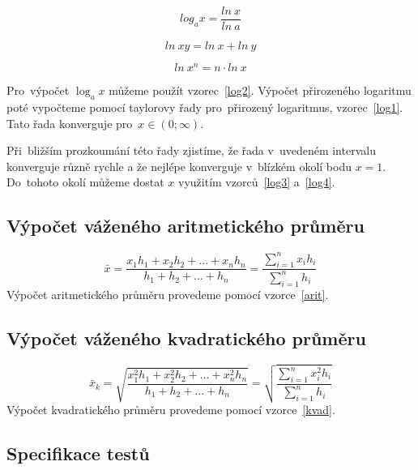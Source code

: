 \documentclass[12pt,a4paper,titlepage,final]{article}
\begin{document}
\begin{equation}
\label{log2}log_{a}x=\frac{ln~x}{ln~a}
\end{equation}

\begin{equation}
\label{log3}ln~xy=ln~x+ln~y
\end{equation}

\begin{equation}
\label{log4}ln~x^{n}=n\cdot ln~x
\end{equation}

Pro~výpočet $\log_{a}{x}$ můžeme použít vzorec~\ref{log2}. Výpočet přirozeného logaritmu
poté vypočteme pomocí taylorovy řady pro~přirozený logaritmus, vzorec~\ref{log1}.
Tato řada konverguje pro~$x\in\left(0;\infty \right) $.

Při~bližším prozkoumání této řady zjistíme, že řada v~uvedeném intervalu konverguje
různě rychle a že nejlépe konverguje v~blízkém okolí bodu $x=1$. Do~tohoto
okolí můžeme dostat $x$ využitím vzorců~\ref{log3} a~\ref{log4}.
\subsection{Výpočet váženého aritmetického průměru}

\begin{equation}
\label{arit}
\bar{x}=\frac{x_{1}h_{1}+x_{2}h_{2}+\ldots+x_{n}h_{n}}{h_{1}+h_{2}+\ldots+h_{n}}
=\frac{\sum\limits_{i=1}^n x_{i}h_{i}}{\sum\limits_{i=1}^n h_{i}}
\end{equation}
Výpočet aritmetického průměru provedeme pomocí vzorce~\ref{arit}. 
\subsection{Výpočet váženého kvadratického průměru}

\begin{equation}
\label{kvad}
\bar{x}_{k}=\sqrt{\frac{x^{2}_{1}h_{1}+x^{2}_{2}h_{2}+\ldots+x^{2}_{n}h_{n}}{h_{1}+h_{2}+\ldots+h_{n}}}
=\sqrt{\frac{\sum\limits_{i=1}^n x^{2}_{i}h_{i}}{\sum\limits_{i=1}^n h_{i}}}
\end{equation}
Výpočet kvadratického průměru provedeme pomocí vzorce~\ref{kvad}. 
\subsection{Specifikace testů} \label{testy}
\end{document}
